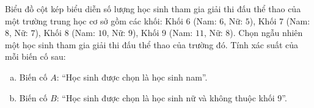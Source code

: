 \begin{bt}%
Biểu đồ cột kép biểu diễn số lượng học sinh tham gia giải thi đấu thể thao của một trường trung học cơ sở gồm các khối: Khối 6 (Nam: $6$, Nữ: $5$), Khối 7 (Nam: $8$, Nữ: $7$), Khối 8 (Nam: $10$, Nữ: $9$), Khối 9 (Nam: $11$, Nữ: $8$). Chọn ngẫu nhiên một học sinh tham gia giải thi đấu thể thao của trường đó. Tính xác suất của mỗi biến cố sau:
\begin{enumerate}[a)]
	\item Biến cố $A$: ``Học sinh được chọn là học sinh nam''.
	\item Biến cố $B$: ``Học sinh được chọn là học sinh nữ và không thuộc khối 9''.
\end{enumerate}
\end{bt}

